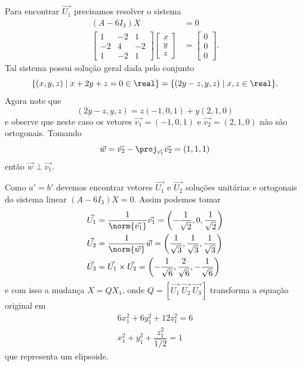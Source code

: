\begin{exemplos}
\begin{enumerate}
\begin{solucao}
			Para encontrar $\vec{U_1}$ precisamos resolver o sistema
			\begin{align*}
				(A - 6I_3)X &= 0\\
				\begin{bmatrix}
					1 & -2 & 1\\
					-2 & 4 & -2\\
					1 & -2 & 1
				\end{bmatrix} \begin{bmatrix}
					x\\ y\\ z
				\end{bmatrix} &= \begin{bmatrix}
					0 \\ 0\\ 0
				\end{bmatrix}.
			\end{align*}
			Tal sistema possui solução geral dada pelo conjunto
			\[
				\{(x, y, z) \mid x + 2y + z = 0 \in \real\} = \{(2y - z, y, z) \mid x, z \in \real\}.
			\]
			Agora note que
			\[
				(2y - z, y, z) = z(-1, 0, 1) + y(2, 1, 0)
			\]
			e observe que neste caso os vetores $\vec{v_1} = (-1,0,1)$ e $\vec{v_2} = (2,1,0)$ não são ortogonais. Tomando
			\[
				\vec{w} = \vec{v_2} - \proj_{\vec{v_1}}\vec{v_2} = (1, 1, 1)
			\]
			então $\vec{w}\perp \vec{v_1}$.

			Como $a' = b'$ devemos encontrar vetores $\vec{U_1}$ e $\vec{U_2}$ soluções unitárias e ortogonais do sistema linear $(A - 6I_3)X = 0$. Assim podemos tomar
			\begin{align*}
				\vec{U_1} &= \dfrac{1}{\norm{\vec{v_1}}}\vec{v_1} = \left(-\dfrac{1}{\sqrt{2}},0,\dfrac{1}{\sqrt{2}}\right)\\
				\vec{U_2} &= \dfrac{1}{\norm{\vec{w}}}\vec{w} = \left(\dfrac{1}{\sqrt{3}},\dfrac{1}{\sqrt{3}},\dfrac{1}{\sqrt{3}}\right)\\
				\vec{U_3} &= \vec{U_1}\times\vec{U_2} = \left(-\dfrac{1}{\sqrt{6}},\dfrac{2}{\sqrt{6}},-\dfrac{1}{\sqrt{6}}\right)
			\end{align*}
			e com isso a mudança $X = QX_1$, onde $Q = [\vec{U_1}\ \vec{U_2}\ \vec{U_3}]$ transforma a equação original em
			\begin{align*}
				6x_1^2 + 6y_1^2 + 12z_1^2 = 6\\
				x_1^2 + y_1^2 + \dfrac{z_1^2}{1/2} = 1
			\end{align*}
			que representa um elipsoide.
		\end{solucao}
	\end{enumerate}
\end{exemplos}





